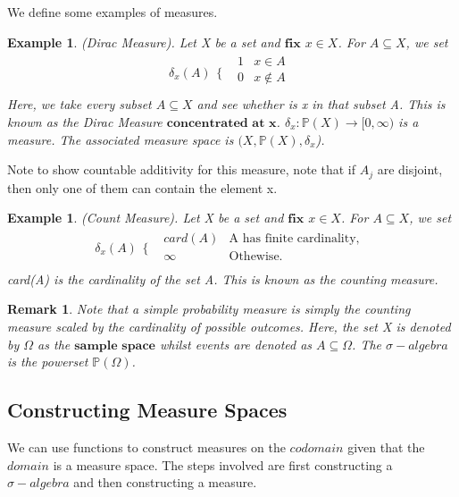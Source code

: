 \documentclass[twoside]{article}
\newtheorem{remark}[theorem]{Remark}
\newtheorem{example}[theorem]{Example}
\newcommand{\sa}{\sigma-algebra}
\begin{document}
We define some examples of measures.
\begin{example}
(Dirac Measure). Let X be a set and $\textbf{fix}$ $x \in X$. For $A \subseteq X$, we set
$$
\delta_x(A) 
\begin{array}{cc}
  \{ & 
    \begin{array}{cc}
      1 & x \in A \\
      0 & x \not\in A \\
    \end{array}
\end{array}
$$
Here, we take every subset $A \subseteq X$ and see whether is x in that subset A. This is known as the Dirac Measure $\textbf{concentrated at x}$. $\delta_x: \mathbb{P}(X) \rightarrow [0, \infty)$ is a measure. The associated measure space is $(X, \mathbb{P}(X), \delta_x$).
\end{example}

Note to show countable additivity for this measure, note that if $A_j$ are disjoint, then only one of them can contain the element x.

\begin{example}
(Count Measure). Let X be a set and $\textbf{fix}$ $x \in X$. For $A \subseteq X$, we set
$$
\delta_x(A) 
\begin{array}{cc}
  \{ & 
    \begin{array}{cc}
      card(A) & \text{A has finite cardinality,} \\
      \infty & \text{Othewise.} \\
    \end{array}
\end{array}
$$
card(A) is the cardinality of the set A. This is known as the counting measure.
\end{example}

\begin{remark}
Note that a simple probability measure is simply the counting measure scaled by the cardinality of possible outcomes. Here, the set X is denoted by $\Omega$ as the $\textbf{sample space}$ whilst events are denoted as $A \subseteq \Omega$. The $\sa$ is the powerset $\mathbb{P}(\Omega)$.
\end{remark}
\subsection{Constructing Measure Spaces}

We can use functions to construct measures on the $\textit{codomain}$ given that the $\textit{domain}$ is a measure space. The steps involved are first constructing a $\sa$ and then constructing a measure.
\end{document}
